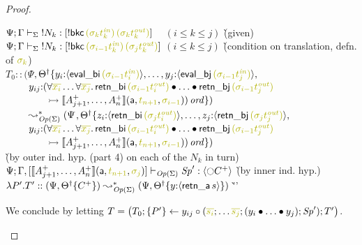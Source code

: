 \begin{proof}
\begin{itemize}
  \begin{tabbing}
  $\slst{\Sigma}{\Psi}{\Gamma}{\tbangr{N_k}}{[{!}{{\sf bkc}\,\lf{({\sigma_k}t_k^{\it in})}\,\lf{({\sigma_k}t_k^{\it out})}}]}$ ~ $(i \leq k \leq j)$
  \` (given) 
  \\
  $\slst{\Sigma}{\Psi}{\Gamma}{\tbangr{N_k}}{[{!}{{\sf bkc}\,\lf{({\sigma_{i-1}}t_k^{\it in})}\,\lf{({\sigma_j}t_k^{\it out})}}]}$ $(i \leq k \leq j)$
  \` (condition on translation, defn. of $\lf{\sigma_k}$)
  \\
  $T_0 :: (\Psi$\=$, \opsubst{\Theta} \tackonstart
        y_i{:}\susp{{\sf eval\_bi}\,\lf{({\sigma_{i-1}}t^{\it in}_i)}}, \ldots,
    y_j{:}\susp{{\sf eval\_bj}\,\lf{({\sigma_{i-1}}t^{\it in}_j)}},$\\
  \>$~ \qquad y_{ij}{:}(\forall\lf{\overline{x_i}}\ldots\forall\lf{\overline{x_j}}.\, 
     {\sf retn\_bi}\,\lf{(\sigma_{i-1}{t^{\it out}_i})}
     \fuse \ldots \fuse 
     {\sf retn\_bj}\,\lf{(\sigma_{i-1}{t^{\it out}_j})}$\\
  \>$~ \qquad\qquad
      \lefti \opbasic{A^+_{j+1},\ldots,A^+_n}{t_{n+1}}{\sigma_{i-1}})\,\mtrue
       \tackonstop)$\\
  $~ \qquad \leadsto^*_{{\it Op}({\Sigma})} 
        (\Psi$\=$, \opsubst{\Theta} \tackonstart
        z_i{:}\susp{{\sf retn\_bi}\,\lf{({\sigma_{j}}t^{\it out}_i)}}, \ldots,
    z_j{:}\susp{{\sf retn\_bj}\,\lf{({\sigma_{j}}t^{\it out}_j)}},$\\
  \>$~ \qquad y_{ij}{:}(\forall\lf{\overline{x_i}}\ldots\forall\lf{\overline{x_j}}.\, 
     {\sf retn\_bi}\,\lf{(\sigma_{i-1}{t^{\it out}_i})}
     \fuse \ldots \fuse 
     {\sf retn\_bj}\,\lf{(\sigma_{i-1}{t^{\it out}_j})}$\\
  \>$~ \qquad\qquad
      \lefti \opbasic{A^+_{j+1},\ldots,A^+_n}{t_{n+1}}{\sigma_{i-1}})\,\mtrue
       \tackonstop)$\\
  \` (by outer ind. hyp. (part 4) on each of the $N_k$ in turn)
  \\
  $\slst{\transop{\Sigma}}{\Psi}
     {\Gamma,[\opbasic{A^+_{j+1},\ldots,A^+_n}{t_{n+1}}{\sigma_{j}}]}
     {\Sp'}{\susp{{\ocircle}C^+}}$  
  \` (by inner ind. hyp.)
  \\
  $\lambda P'.T' :: (\Psi, {{{\Theta}^\dag}}\{{C^+}\}) 
       \leadsto^*_{{\it Op}({\Sigma})}
        (\Psi, {{{\Theta}^\dag}}\{{y{:}\langle {{\sf retn\_a}\,s} \rangle}\})$ 
 \` ''\qquad\qquad~
  \end{tabbing}
  We  conclude  by letting $T = 
  \left(T_0; \tstep{P'}{y_{ij}}{(\lf{\overline{s_i}}; \ldots \lf{\overline{s_j}}; (\tfuser{y_i}{\tfuser{\ldots}{y_j}}); \Sp')}; T'\right)$.
  \bigskip


\end{itemize}
\end{proof}
